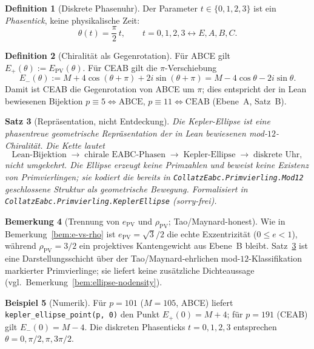 \documentclass[11pt,a4paper]{article}
\theoremstyle{definition}
\newtheorem{definition}{Definition}[section]
\newtheorem{beispiel}[definition]{Beispiel}
\newtheorem{bemerkung}[definition]{Bemerkung}
\theoremstyle{plain}
\newtheorem{satz}[definition]{Satz}
\newcommand{\rhoPV}{\rho_{\mathrm{PV}}}
\begin{document}
	\begin{definition}[Diskrete Phasenuhr]
		Der Parameter $t\in\{0,1,2,3\}$ ist ein \emph{Phasentick}, keine physikalische Zeit:
		\[
		\theta(t)=\frac{\pi}{2}\,t,
		\qquad
		t=0,1,2,3 \longleftrightarrow E,A,B,C.
		\]
	\end{definition}
	
	\begin{definition}[Chiralität als Gegenrotation]
		Für ABCE gilt $E_+(\theta):=E_{\mathrm{PV}}(\theta)$. Für CEAB gilt die $\pi$-Verschiebung
		\[
		E_-(\theta):=M+4\cos(\theta+\pi)+2i\sin(\theta+\pi)=M-4\cos\theta-2i\sin\theta.
		\]
		Damit ist CEAB die Gegenrotation von ABCE um $\pi$; dies entspricht der in Lean bewiesenen Bijektion $p\equiv5\Leftrightarrow\mathrm{ABCE}$, $p\equiv11\Leftrightarrow\mathrm{CEAB}$ (Ebene~A, Satz~B).
	\end{definition}
	
	\begin{satz}[Repräsentation, nicht Entdeckung]\label{satz:kepler-repr}
		Die Kepler-Ellipse ist eine phasentreue geometrische Repräsentation der in Lean bewiesenen mod-$12$-Chiralität. Die Kette lautet
		\[
		\text{Lean-Bijektion}\;\longrightarrow\;\text{chirale EABC-Phasen}\;\longrightarrow\;\text{Kepler-Ellipse}\;\longrightarrow\;\text{diskrete Uhr},
		\]
		nicht umgekehrt. Die Ellipse erzeugt keine Primzahlen und beweist keine Existenz von Primvierlingen; sie kodiert die bereits in \texttt{CollatzEabc.Primvierling.Mod12} geschlossene Struktur als geometrische Bewegung. Formalisiert in \texttt{CollatzEabc.Primvierling.KeplerEllipse} (sorry-frei).
	\end{satz}
	
	\begin{bemerkung}[Trennung von $e_{\mathrm{PV}}$ und $\rhoPV$; Tao/Maynard-honest]
		Wie in Bemerkung~\ref{bem:e-vs-rho} ist $e_{\mathrm{PV}}=\sqrt{3}/2$ die echte Exzentrizität ($0\leq e<1$), während $\rhoPV=3/2$ ein projektives Kantengewicht aus Ebene~B bleibt. Satz~\ref{satz:kepler-repr} ist eine Darstellungsschicht über der Tao/Maynard-ehrlichen mod-$12$-Klassifikation markierter Primvierlinge; sie liefert keine zusätzliche Dichteaussage (vgl.\ Bemerkung~\ref{bem:ellipse-nodensity}).
	\end{bemerkung}
	
	\begin{beispiel}[Numerik]
		Für $p=101$ ($M=105$, ABCE) liefert \texttt{kepler\_ellipse\_point(p, 0)} den Punkt $E_+(0)=M+4$; für $p=191$ (CEAB) gilt $E_-(0)=M-4$. Die diskreten Phasenticks $t=0,1,2,3$ entsprechen $\theta=0,\pi/2,\pi,3\pi/2$.
	\end{beispiel}
	
\end{document}
